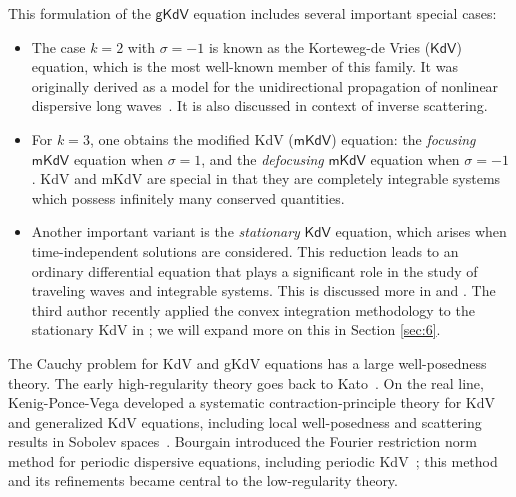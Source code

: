 \documentclass[12pt,reqno,letterpaper]{amsart}
\numberwithin{equation}{section}
\newcommand{\1}{{\bf 1}}
\newcommand{\2}{{\bf 2}}
\theoremstyle{remark}
\theoremstyle{remark}
\begin{document}
This formulation of the $\textsf{gKdV}$ equation includes several important special cases:
\begin{itemize}
    \item The case $k = 2$ with $\sigma = -1$ is known as the Korteweg-de Vries ($\textsf{KdV}$) equation, which is the most well-known member of this family. It was originally derived as a model for the unidirectional propagation of nonlinear dispersive long waves~\cite{KDV}. It is also discussed in context of inverse scattering.
    
    \item For $k = 3$, one obtains the modified \textsf{KdV} ($\textsf{mKdV}$) equation: the \textit{focusing} $\textsf{mKdV}$ equation when $\sigma = 1$, and the \textit{defocusing} $\textsf{mKdV}$ equation when $\sigma = -1$. \textsf{KdV} and \textsf{mKdV} are special in that they are completely integrable systems which possess infinitely many conserved quantities.
    
    \item Another important variant is the \textit{stationary} $\textsf{KdV}$ equation, which arises when time-independent solutions are considered. This reduction leads to an ordinary differential equation that plays a significant role in the study of traveling waves and integrable systems. This is discussed more in \cite{DN} and \cite{FN2016}. The third author recently applied the convex integration methodology to the stationary \textsf{KdV} in \cite{Pathak}; we will expand more on this in Section \ref{sec:6}. 
    
\end{itemize}



The Cauchy problem for \textsf{KdV} and \textsf{gKdV} equations has a large well-posedness theory. The early high-regularity theory goes back to Kato~\cite{Kato1983}. On the real line, Kenig-Ponce-Vega developed a systematic contraction-principle theory for \textsf{KdV} and generalized \textsf{KdV} equations, including local well-posedness and scattering results in Sobolev spaces~\cite{KPV1991,KPV1993}. Bourgain introduced the Fourier restriction norm method for periodic dispersive equations, including periodic \textsf{KdV}~\cite{BourgainKdV}; this method and its refinements became central to the low-regularity theory.
\end{document}
